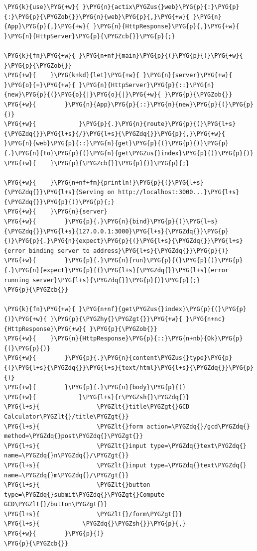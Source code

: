 \begin{Verbatim}[commandchars=\\\{\},breaklines=true,breakanywhere=true,fontsize=\codefont,xleftmargin=17bp]
\PYG{k}{use}\PYG{+w}{ }\PYG{n}{actix\PYGZus{}web}\PYG{p}{:}\PYG{p}{:}\PYG{p}{\PYGZob{}}\PYG{n}{web}\PYG{p}{,}\PYG{+w}{ }\PYG{n}{App}\PYG{p}{,}\PYG{+w}{ }\PYG{n}{HttpResponse}\PYG{p}{,}\PYG{+w}{ }\PYG{n}{HttpServer}\PYG{p}{\PYGZcb{}}\PYG{p}{;}

\PYG{k}{fn}\PYG{+w}{ }\PYG{n+nf}{main}\PYG{p}{(}\PYG{p}{)}\PYG{+w}{ }\PYG{p}{\PYGZob{}}
\PYG{+w}{    }\PYG{k+kd}{let}\PYG{+w}{ }\PYG{n}{server}\PYG{+w}{ }\PYG{o}{=}\PYG{+w}{ }\PYG{n}{HttpServer}\PYG{p}{::}\PYG{n}{new}\PYG{p}{(}\PYG{o}{|}\PYG{o}{|}\PYG{+w}{ }\PYG{p}{\PYGZob{}}
\PYG{+w}{        }\PYG{n}{App}\PYG{p}{::}\PYG{n}{new}\PYG{p}{(}\PYG{p}{)}
\PYG{+w}{            }\PYG{p}{.}\PYG{n}{route}\PYG{p}{(}\PYG{l+s}{\PYGZdq{}}\PYG{l+s}{/}\PYG{l+s}{\PYGZdq{}}\PYG{p}{,}\PYG{+w}{ }\PYG{n}{web}\PYG{p}{::}\PYG{n}{get}\PYG{p}{(}\PYG{p}{)}\PYG{p}{.}\PYG{n}{to}\PYG{p}{(}\PYG{n}{get\PYGZus{}index}\PYG{p}{)}\PYG{p}{)}
\PYG{+w}{    }\PYG{p}{\PYGZcb{}}\PYG{p}{)}\PYG{p}{;}

\PYG{+w}{    }\PYG{n+nf+fm}{println!}\PYG{p}{(}\PYG{l+s}{\PYGZdq{}}\PYG{l+s}{Serving on http://localhost:3000...}\PYG{l+s}{\PYGZdq{}}\PYG{p}{)}\PYG{p}{;}
\PYG{+w}{    }\PYG{n}{server}
\PYG{+w}{        }\PYG{p}{.}\PYG{n}{bind}\PYG{p}{(}\PYG{l+s}{\PYGZdq{}}\PYG{l+s}{127.0.0.1:3000}\PYG{l+s}{\PYGZdq{}}\PYG{p}{)}\PYG{p}{.}\PYG{n}{expect}\PYG{p}{(}\PYG{l+s}{\PYGZdq{}}\PYG{l+s}{error binding server to address}\PYG{l+s}{\PYGZdq{}}\PYG{p}{)}
\PYG{+w}{        }\PYG{p}{.}\PYG{n}{run}\PYG{p}{(}\PYG{p}{)}\PYG{p}{.}\PYG{n}{expect}\PYG{p}{(}\PYG{l+s}{\PYGZdq{}}\PYG{l+s}{error running server}\PYG{l+s}{\PYGZdq{}}\PYG{p}{)}\PYG{p}{;}
\PYG{p}{\PYGZcb{}}

\PYG{k}{fn}\PYG{+w}{ }\PYG{n+nf}{get\PYGZus{}index}\PYG{p}{(}\PYG{p}{)}\PYG{+w}{ }\PYG{p}{\PYGZhy{}\PYGZgt{}}\PYG{+w}{ }\PYG{n+nc}{HttpResponse}\PYG{+w}{ }\PYG{p}{\PYGZob{}}
\PYG{+w}{    }\PYG{n}{HttpResponse}\PYG{p}{::}\PYG{n+nb}{Ok}\PYG{p}{(}\PYG{p}{)}
\PYG{+w}{        }\PYG{p}{.}\PYG{n}{content\PYGZus{}type}\PYG{p}{(}\PYG{l+s}{\PYGZdq{}}\PYG{l+s}{text/html}\PYG{l+s}{\PYGZdq{}}\PYG{p}{)}
\PYG{+w}{        }\PYG{p}{.}\PYG{n}{body}\PYG{p}{(}
\PYG{+w}{            }\PYG{l+s}{r\PYGZsh{}\PYGZdq{}}
\PYG{l+s}{                \PYGZlt{}title\PYGZgt{}GCD Calculator\PYGZlt{}/title\PYGZgt{}}
\PYG{l+s}{                \PYGZlt{}form action=\PYGZdq{}/gcd\PYGZdq{} method=\PYGZdq{}post\PYGZdq{}\PYGZgt{}}
\PYG{l+s}{                \PYGZlt{}input type=\PYGZdq{}text\PYGZdq{} name=\PYGZdq{}n\PYGZdq{}/\PYGZgt{}}
\PYG{l+s}{                \PYGZlt{}input type=\PYGZdq{}text\PYGZdq{} name=\PYGZdq{}m\PYGZdq{}/\PYGZgt{}}
\PYG{l+s}{                \PYGZlt{}button type=\PYGZdq{}submit\PYGZdq{}\PYGZgt{}Compute GCD\PYGZlt{}/button\PYGZgt{}}
\PYG{l+s}{                \PYGZlt{}/form\PYGZgt{}}
\PYG{l+s}{            \PYGZdq{}\PYGZsh{}}\PYG{p}{,}
\PYG{+w}{        }\PYG{p}{)}
\PYG{p}{\PYGZcb{}}
\end{Verbatim}

